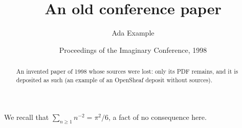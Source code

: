 \documentclass[11pt]{article}
\title{An old conference paper}
\author{Ada Example}
\date{Proceedings of the Imaginary Conference, 1998}
\begin{document}
\maketitle
\begin{abstract}
An invented paper of 1998 whose sources were lost: only its PDF remains, and it
is deposited as such (an example of an OpenSheaf deposit without sources).
\end{abstract}
We recall that $\sum_{n\ge1} n^{-2} = \pi^2/6$, a fact of no consequence here.
\end{document}
